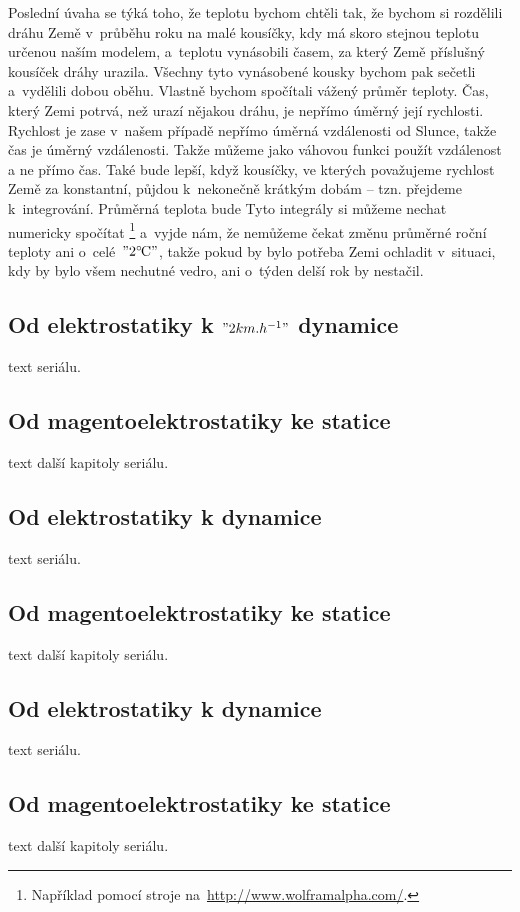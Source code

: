 \documentclass[twoside,fykos]{fksserie}
\begin{document}
Poslední úvaha se týká toho, že  teplotu bychom chtěli  tak, že
bychom si rozdělili dráhu 
Země v~průběhu roku na malé kousíčky, kdy má skoro stejnou teplotu
určenou naším modelem, a~teplotu vynásobili časem, za který Země příslušný
kousíček dráhy urazila. Všechny tyto vynásobené kousky bychom pak sečetli
a~vydělili dobou oběhu. Vlastně bychom spočítali vážený průměr teploty. 
Čas, který Zemi potrvá, než urazí nějakou dráhu, je 
nepřímo úměrný její rychlosti. Rychlost je zase v~našem případě nepřímo
úměrná vzdálenosti od Slunce, takže čas je úměrný vzdálenosti. Takže
můžeme jako váhovou funkci použít vzdálenost a ne přímo čas. Také
bude lepší, když kousíčky, ve kterých považujeme rychlost Země za konstantní,
půjdou k~nekonečně krátkým dobám -- tzn. přejdeme k~integrování. 
Průměrná teplota bude 
Tyto integrály si můžeme nechat numericky spočítat%
\footnote{Například pomocí stroje na~\url{http://www.wolframalpha.com/}.}
a~vyjde nám, že nemůžeme čekat změnu průměrné roční teploty ani o~celé~$"2 ^\circ\mskip-2mu\mathrm{C}"$, 
takže pokud by bylo potřeba Zemi ochladit v~situaci, kdy by bylo všem 
nechutné vedro, ani o~týden delší rok by nestačil.



\subsection[Od elektrostatiky k 2 km/h dynamice]{Od elektrostatiky k $"2 km.h^{-1}"$ dynamice}
text seriálu.

\subsection{Od magentoelektrostatiky ke statice}
text další kapitoly seriálu.

\subsection{Od elektrostatiky k dynamice}
text seriálu.

\subsection{Od magentoelektrostatiky ke statice}
text další kapitoly seriálu.

\subsection{Od elektrostatiky k dynamice}
text seriálu.

\subsection{Od magentoelektrostatiky ke statice}
text další kapitoly seriálu.

\listoffigures


\makefooter %
\end{document}
